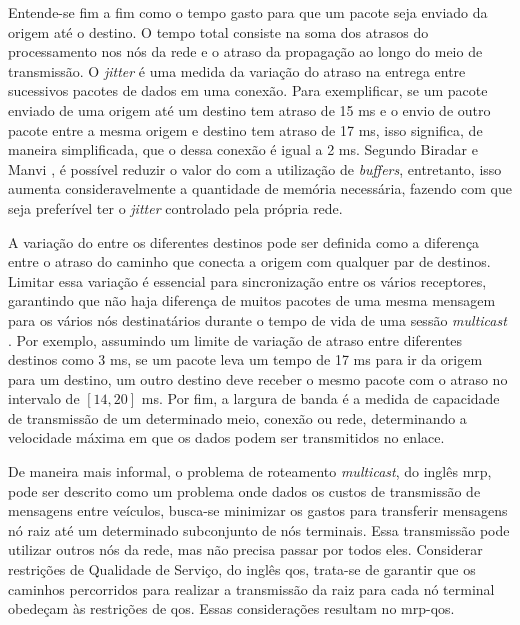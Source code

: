Entende-se {\delay}  fim a fim como  o tempo gasto para  que um pacote
seja enviado da origem até o  destino.  O tempo total consiste na soma
dos atrasos do processamento nos nós  da rede e o atraso da propagação
ao longo  do meio de transmissão.   O \textit{jitter} é uma  medida da
variação do atraso na entrega entre sucessivos pacotes de dados em uma
conexão.  Para exemplificar, se um pacote enviado de uma origem até um
destino tem atraso  de 15 ms e  o envio de outro pacote  entre a mesma
origem  e destino  tem atraso  de 17  ms, isso  significa, de  maneira
simplificada, que o  {\jitter} dessa conexão é igual a  2 ms.  Segundo
Biradar e  Manvi \cite{biradar:2012},  é possível  reduzir o  valor do
{\jitter}  com  a  utilização de  \textit{buffers},  entretanto,  isso
aumenta consideravelmente a quantidade  de memória necessária, fazendo
com que seja preferível ter  o \textit{jitter} controlado pela própria
rede.

A variação  do {\delay}  entre os diferentes  destinos pode  ser definida
como a  diferença entre o atraso  do caminho que conecta  a origem com
qualquer  par de  destinos.  Limitar  essa variação  é essencial  para
sincronização  entre os  vários  receptores, garantindo  que não  haja
diferença de muitos  pacotes de uma mesma mensagem para  os vários nós
destinatários durante o tempo de vida de uma sessão \textit{multicast}
\cite{rouskas:1997}. Por  exemplo, assumindo um limite  de variação de
atraso entre diferentes destinos como 3 ms, se um pacote leva um tempo
de 17  ms para  ir da origem  para um destino,  um outro  destino deve
receber o  mesmo pacote com  o atraso no  intervalo de $[14,  20]$ ms.
Por fim, a largura de banda é a medida de capacidade de transmissão de
um determinado meio, conexão ou rede, determinando a velocidade máxima
em que os dados podem ser transmitidos no enlace.

De maneira mais informal, o problema de roteamento \textit{multicast},
do inglês \gls{mrp}, pode ser descrito  como um problema onde dados os
custos de transmissão de  mensagens entre veículos, busca-se minimizar
os  gastos  para  transferir  mensagens nó  raiz  até  um  determinado
subconjunto de  nós terminais.  Essa transmissão  pode utilizar outros
nós  da rede,  mas  não  precisa passar  por  todos eles.   Considerar
restrições de Qualidade  de Serviço, do inglês  \gls{qos}, trata-se de
garantir que  os caminhos percorridos  para realizar a  transmissão da
raiz para cada nó terminal  obedeçam às restrições de \gls{qos}. Essas
considerações resultam no \gls{mrp-qos}.


